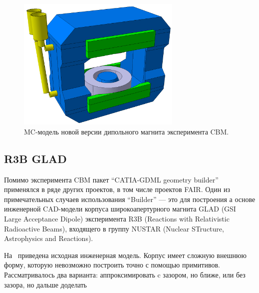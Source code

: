 \begin{figure}[H]
\centering
\includegraphics[width=0.7\textwidth]{pictures/New_CBM_magnet.png}
\caption{MC-модель новой версии дипольного магнита эксперимента CBM.}
\label{fig:NewCbmMagnet1}
\end{figure}

\subsection{R3B GLAD}\label{sec:secGlad}

Помимо эксперимента CBM пакет ``CATIA-GDML geometry builder'' применялся в ряде других проектов, в том числе проектов FAIR. Один из примечательных случаев использования ``Builder'' --- это для построения а основе инженерной CAD-модели корпуса широкоапертурного магнита GLAD (GSI Large Acceptance Dipole) эксперимента R3B (Reactions with Relativistic Radioactive Beams), входящего в группу NUSTAR (Nuclear STructure, Astrophysics and Reactions).

На~ приведена исходная инженерная модель. Корпус имеет сложную внешнюю форму, которую невозможно построить точно с помощью примитивов. Рассматривалось два варианта: аппроксимировать c зазором, но ближе, или без зазора, но дальше \todo доделать

